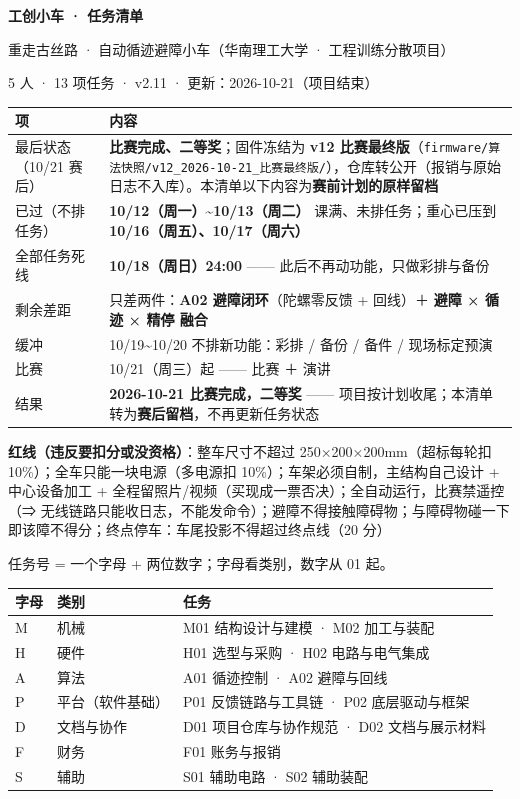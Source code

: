 \documentclass[10.5pt]{article}
\newcommand{\sect}[1]{\par\vspace{9pt}{\large\bfseries\color{accent}#1}\par\vspace{3pt}}
\begin{document}
\begin{center}
{\LARGE\bfseries 工创小车 · 任务清单}\par\vspace{4pt}
{\small 重走古丝路 · 自动循迹避障小车（华南理工大学 · 工程训练分散项目）}\par\vspace{2pt}
{\small 5 人 · 13 项任务 · v2.11 · 更新：2026-10-21（项目结束）}\par
\end{center}
\vspace{-2pt}

\sect{0. 关键时间与红线}
\begin{tabular}{@{}L{2.6cm}L{14.4cm}@{}}
\toprule
\textbf{项} & \textbf{内容}\tabularnewline
\midrule
最后状态（10/21 赛后） & \textbf{比赛完成、二等奖}；固件冻结为 \textbf{v12 比赛最终版}（\texttt{firmware/算法快照/v12\_2026-10-21\_比赛最终版/}），仓库转公开（报销与原始日志不入库）。本清单以下内容为\textbf{赛前计划的原样留档}\tabularnewline
已过（不排任务） & \textbf{10/12（周一）\textasciitilde{}10/13（周二）} 课满、未排任务；重心已压到 \textbf{10/16（周五）、10/17（周六）}\tabularnewline
全部任务死线 & \textbf{10/18（周日）24:00} —— 此后不再动功能，只做彩排与备份\tabularnewline
剩余差距 & 只差两件：\textbf{A02 避障闭环}（陀螺零反馈 + 回线）＋ \textbf{避障 × 循迹 × 精停 融合}\tabularnewline
缓冲 & 10/19\textasciitilde{}10/20 不排新功能：彩排 / 备份 / 备件 / 现场标定预演\tabularnewline
比赛 & 10/21（周三）起 —— 比赛 ＋ 演讲\tabularnewline
结果 & \textbf{2026-10-21 比赛完成，二等奖} —— 项目按计划收尾；本清单转为\textbf{赛后留档}，不再更新任务状态\tabularnewline
\bottomrule
\end{tabular}

\par\vspace{4pt}
{\small \textbf{红线（违反要扣分或没资格）}：整车尺寸不超过 250×200×200mm（超标每轮扣 10\%）；全车只能一块电源（多电源扣 10\%）；车架必须自制，主结构自己设计 + 中心设备加工 + 全程留照片/视频（买现成一票否决）；全自动运行，比赛禁遥控（⇒ 无线链路只能收日志，不能发命令）；避障不得接触障碍物；与障碍物碰一下即该障不得分；终点停车：车尾投影不得超过终点线（20 分）}\par

\sect{1. 编号规则}
任务号 = 一个字母 + 两位数字；字母看类别，数字从 01 起。\par\vspace{3pt}
\begin{tabular}{@{}L{1.2cm}L{4.2cm}L{11.6cm}@{}}
\toprule
\textbf{字母} & \textbf{类别} & \textbf{任务}\tabularnewline
\midrule
M & 机械 & M01 结构设计与建模 · M02 加工与装配\tabularnewline
H & 硬件 & H01 选型与采购 · H02 电路与电气集成\tabularnewline
A & 算法 & A01 循迹控制 · A02 避障与回线\tabularnewline
P & 平台（软件基础） & P01 反馈链路与工具链 · P02 底层驱动与框架\tabularnewline
D & 文档与协作 & D01 项目仓库与协作规范 · D02 文档与展示材料\tabularnewline
F & 财务 & F01 账务与报销\tabularnewline
S & 辅助 & S01 辅助电路 · S02 辅助装配\tabularnewline
\bottomrule
\end{tabular}
\end{document}
